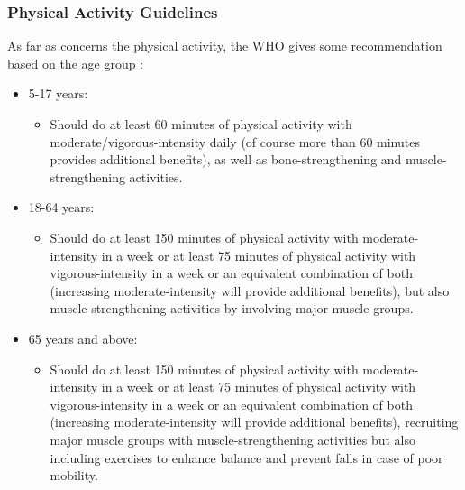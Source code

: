 \subsubsection{Physical Activity Guidelines}
As far as concerns the physical activity, the WHO gives some recommendation based on the age group \cite{WhoPhysicalActivityGuidelines}:
\vspace{3ex}
\begin{itemize}[nosep] %
    \item 5-17 years:\vspace{2ex}
          \begin{itemize}[nosep]
              \item Should do at least 60 minutes of physical activity with moderate/vigorous-intensity daily (of course more than 60 minutes provides additional benefits), as well as bone-strengthening and muscle-strengthening activities.
          \end{itemize}
          \vspace{3ex}
    \item 18-64 years:\vspace{2ex}
          \begin{itemize}[nosep]
              \item Should do at least 150 minutes of physical activity with moderate-intensity in a week or at least 75 minutes of physical activity with vigorous-intensity in a week or an equivalent combination of both (increasing moderate-intensity will provide additional benefits), but also muscle-strengthening activities by involving major muscle groups.
          \end{itemize}
          \vspace{3ex}
    \item 65 years and above:\vspace{2ex}
          \begin{itemize}[nosep]
              \item Should do at least 150 minutes of physical activity with moderate-intensity in a week or at least 75 minutes of physical activity with vigorous-intensity in a week or an equivalent combination of both (increasing moderate-intensity will provide additional benefits), recruiting major muscle groups with muscle-strengthening activities but also including exercises to enhance balance and prevent falls in case of poor mobility.
          \end{itemize}
\end{itemize}
